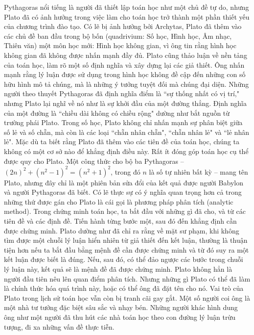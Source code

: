 \begin{multicols}{2}
		\vskip 0.1cm
		Pythagoras nổi tiếng là người đã thiết lập toán học như một chủ đề tự do, nhưng Plato đã có ảnh hưởng trong việc làm cho toán học trở thành một phần thiết yếu của chương trình đào tạo.
		\vskip 0.1cm
		Có lẽ bị ảnh hưởng bởi Archytas, Plato đã thêm vào các chủ đề ban đầu trong bộ bốn (quadrivium: Số học, Hình học, Âm nhạc, Thiên văn) một môn học mới: Hình học không gian, vì ông tin rằng hình học không gian đã không được nhấn mạnh đầy đủ. Plato cũng thảo luận về nền tảng của toán học, làm rõ một số định nghĩa và xây dựng lại các giả thiết. Ông nhấn mạnh rằng lý luận được sử dụng trong hình học không đề cập đến những con số hữu hình mô tả chúng, mà là những ý tưởng tuyệt đối mà chúng đại diện. 
		\vskip 0.1cm
		Những người theo thuyết Pythagoras đã định nghĩa điểm là ``sự thống nhất có vị trí," nhưng Plato lại nghĩ về nó như là sự khởi đầu của một đường thẳng.
		\vskip 0.1cm 
		Định nghĩa của một đường là ``chiều dài không có chiều rộng" dường như bắt nguồn từ trường phái Plato.
		\vskip 0.1cm
		Trong số học, Plato không chỉ nhấn mạnh sự phân biệt giữa số lẻ và số chẵn, mà còn là các loại ``chẵn nhân chẵn", ``chẵn nhân lẻ" và ``lẻ nhân lẻ". Mặc dù ta biết rằng Plato đã thêm vào các tiên đề của toán học, chúng ta không có một cơ sở nào để khẳng định điều này.
		\vskip 0.1cm
		Rất ít đóng góp toán học cụ thể được quy cho Plato. Một công thức cho bộ ba Pythagoras -- ${(2n)^2} + {({n^2} - 1)^2} = {({n^2} + 1)^2}$, trong đó  $n$ là số tự nhiên bất kỳ -- mang tên Plato, nhưng đây chỉ là một phiên bản sửa đổi của kết quả được người Babylon và người Pythagoras đã biết. 
		\vskip 0.1cm
		Có lẽ thực sự có ý nghĩa quan trọng hơn cả trong những thứ được gán cho Plato là cái gọi là phương pháp phân tích (analytic method).
		\vskip 0.1cm
		Trong chứng minh toán học, ta bắt đầu với những gì đã cho, và từ các tiên đề và các định đề. Tiến hành từng bước một, sau đó đến khẳng định cần được chứng minh.
		\vskip 0.1cm
		Plato dường như đã chỉ ra rằng  về mặt sư phạm, khi không tìm được một chuỗi lý luận hiển nhiên từ giả thiết đến kết luận, thường là thuận tiện hơn nếu ta bắt đầu bằng mệnh đề cần được chứng minh và từ đó suy ra một kết luận được biết là đúng. Nếu, sau đó, có thể đảo ngược các bước trong chuỗi lý luận này, kết quả sẽ là mệnh đề đã được chứng minh.
		\vskip 0.1cm
		Plato không hẳn là người đầu tiên nêu lên quan điểm phân tích.  Nhưng những gì Plato có thể đã làm là chính thức hóa quá trình này, hoặc có thể ông đã đặt tên cho nó.
		\vskip 0.1cm
		Vai trò của Plato trong lịch sử toán học vẫn còn bị tranh cãi gay gắt. Một số người coi ông là một nhà tư tưởng đặc biệt sâu sắc và nhạy bén. Những người khác hình dung ông như một người đã thu hút các nhà toán học theo con đường lý luận trừu tượng, đi xa những vấn đề thực tiễn. 

\end{multicols}
